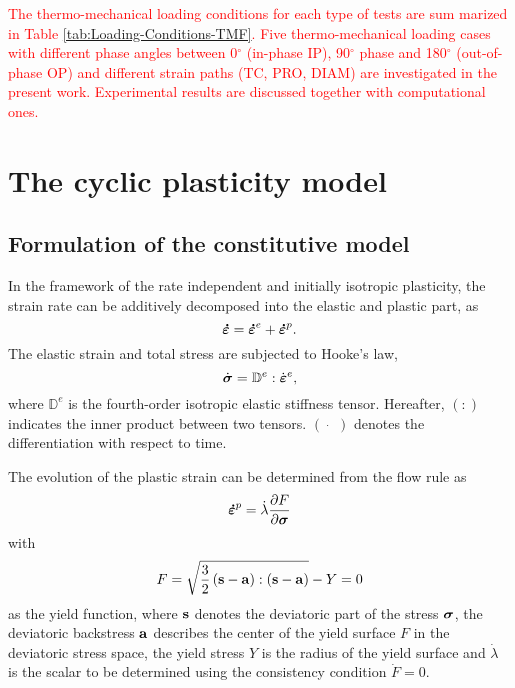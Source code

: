 \documentclass[preprint,5p,twocolumn,11pt,sort&compress]{elsarticle}
\newcommand{\bfsigma}{{\mbox{\boldmath{$\sigma$}}}}
\newcommand{\bfepsilon}{{\mbox{\boldmath{$\varepsilon$}}}}
\newcommand{\dotbfepsilon}{{\mbox{\boldmath{$\dot\varepsilon$}}}}
\newcommand{\bfa}{{\bf a}}
\newcommand{\bfs}{{\bf s}}
\newcommand{\marked}[1]{\textcolor{red}{#1}}
\begin{document}
\marked{The thermo-mechanical loading conditions for each type of tests are sum
marized in Table \ref{tab:Loading-Conditions-TMF}.
Five thermo-mechanical loading cases with different phase angles between 0$^{\circ}$ (in-phase IP), 90$^{\circ}$ phase and 180$^{\circ}$ (out-of-phase OP) and different strain paths (TC, PRO, DIAM) are investigated in the present work.
Experimental results are discussed together with computational ones.}


\section{The cyclic plasticity model}

\subsection{Formulation of the constitutive model}
\noindent
In the framework of the rate independent and initially isotropic plasticity, the strain rate can be additively decomposed into the elastic and plastic  part, as
\begin{equation}
\dotbfepsilon = {\dotbfepsilon}^e + {\dotbfepsilon}^p.
\end{equation}
The elastic strain and total stress are subjected to Hooke's law,
\begin{equation}
{\dot\bfsigma} = {\mathbb{D}^e}:{\dot\bfepsilon^e},
\label{Equ:HookesLaw}
\end{equation}
where ${\mathbb{D}^e}$ is the fourth-order isotropic elastic stiffness tensor. Hereafter, $(:)$ indicates the inner product between two tensors. $(\dot{\quad})$ denotes the differentiation with respect to time.

The evolution of the plastic strain can be determined from the flow rule as
\begin{equation}
{\dotbfepsilon}^p = \dot \lambda \frac{{\partial F}}{{\partial {\bfsigma}}}
\end{equation}
with
\begin{equation}
F = \sqrt {\frac{3}{2}\left( {\bfs - \bfa} \right):\left( {\bfs - \bfa} \right)}  - Y=0
\end{equation}
as the yield function, where $\bfs$ denotes the deviatoric part of the stress ${\bfsigma}$, the deviatoric backstress $\bfa$ describes the center of the yield surface $F$ in the deviatoric stress space, the yield stress $Y$ is the radius of the yield surface and $\dot \lambda$ is the scalar to be determined using the consistency condition $\dot F = 0$.
\end{document}
